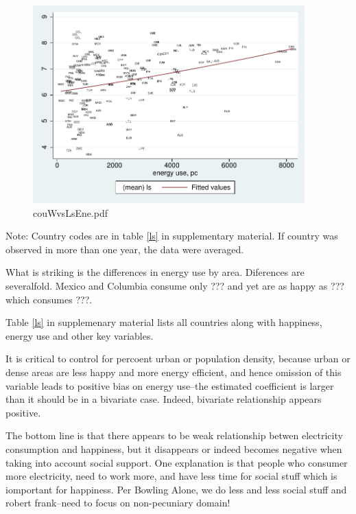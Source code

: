 \documentclass[10pt, letterpaper]{article}
\begin{document}
\begin{spacing}{1.4}
\begin{figure}[H]
 \includegraphics[height=3in]{graphsAndTables/couWvsLsEne.pdf}\centering
\caption{couWvsLsEne.pdf}\label{couWvsLsEne.pdf}
\end{figure}
{\scriptsize Note: Country codes are in table \ref{ls} in supplementary
  material. If country was observed in more than one year, the data were averaged.}

What is striking is the differences in energy use by area. Diferences are
severalfold. Mexico and Columbia
consume only ??? and yet are as happy as ??? which consumes ???.
 
Table \ref{ls} in supplemenary material lists all countries along with
happiness, energy use and other key variables.

It is critical to control for percoent urban or population density, because
urban or dense areas are less happy and more energy efficient, and hence
omission of this variable leads to positive bias on energy use--the estimated
coefficient   is larger than it should be in a bivariate case. Indeed, bivariate
relationship appears positive. 

The bottom line is that there appears to be weak relationship betwen electricity
consumption and happiness, but it disappears or indeed becomes negative when
taking into account social support. One explanation is that people who consumer
more electricity, need to work more, and have less time for social stuff which
is iomportant for happiness. Per Bowling Alone, we do less and less social stuff
and robert frank--need to focus on non-pecuniary domain!


\end{spacing}
\end{document}
